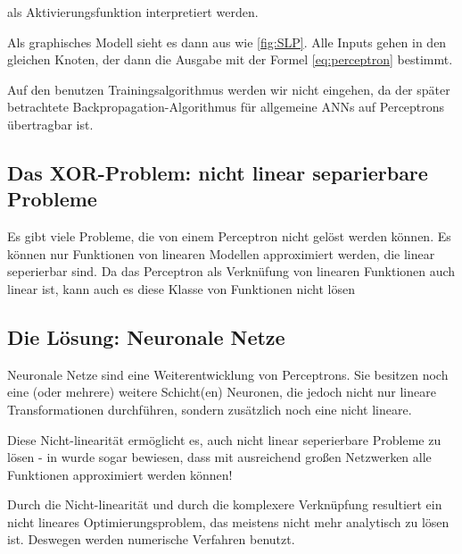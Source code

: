 als Aktivierungsfunktion interpretiert werden.

Als graphisches Modell sieht es dann aus wie \ref{fig:SLP}. Alle Inputs gehen in den gleichen Knoten, der dann die Ausgabe mit der Formel \ref{eq:perceptron} bestimmt. 

Auf den benutzen Trainingsalgorithmus werden wir nicht eingehen, da der später betrachtete Backpropagation-Algorithmus für allgemeine ANNs auf Perceptrons übertragbar ist.

\subsection{Das XOR-Problem: nicht linear separierbare Probleme}
Es gibt viele Probleme, die von einem Perceptron nicht gelöst werden können. Es können nur Funktionen von linearen Modellen approximiert werden, die linear seperierbar sind. Da das Perceptron als Verknüfung von linearen Funktionen auch linear ist, kann auch es diese Klasse von Funktionen nicht lösen

\subsection{Die Lösung: Neuronale Netze}
Neuronale Netze sind eine Weiterentwicklung von Perceptrons. Sie besitzen noch eine (oder mehrere) weitere Schicht(en) Neuronen, die jedoch nicht nur lineare Transformationen durchführen, sondern zusätzlich noch eine nicht lineare.

Diese Nicht-linearität ermöglicht es, auch nicht linear seperierbare Probleme zu lösen - in \cite{cybenko1989approximation} wurde sogar bewiesen, dass mit ausreichend großen Netzwerken alle Funktionen approximiert werden können!

Durch die Nicht-linearität und durch die komplexere Verknüpfung resultiert ein nicht lineares Optimierungsproblem, das meistens nicht mehr analytisch zu lösen ist. Deswegen werden numerische Verfahren benutzt.


